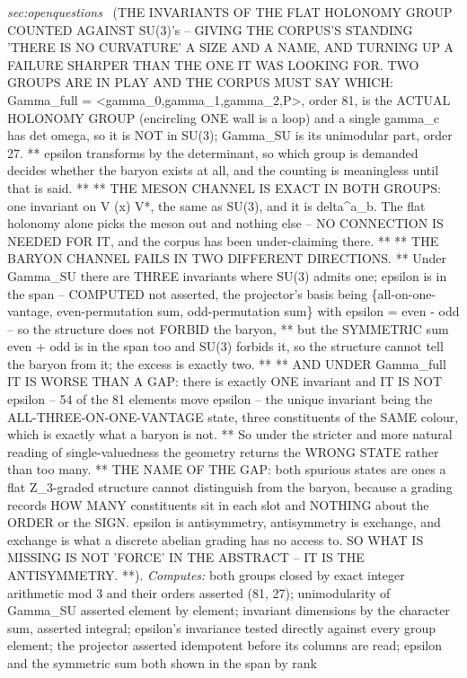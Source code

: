 \begin{description}
\textit{sec:openquestions} \ (THE INVARIANTS OF THE FLAT HOLONOMY GROUP COUNTED AGAINST SU(3)'s -- GIVING THE CORPUS'S STANDING 'THERE IS NO CURVATURE' A SIZE AND A NAME, AND TURNING UP A FAILURE SHARPER THAN THE ONE IT WAS LOOKING FOR. TWO GROUPS ARE IN PLAY AND THE CORPUS MUST SAY WHICH: Gamma\_full = <gamma\_0,gamma\_1,gamma\_2,P>, order 81, is the ACTUAL HOLONOMY GROUP (encircling ONE wall is a loop) and a single gamma\_c has det omega, so it is NOT in SU(3); Gamma\_SU is its unimodular part, order 27. ** epsilon transforms by the determinant, so which group is demanded decides whether the baryon exists at all, and the counting is meaningless until that is said. ** ** THE MESON CHANNEL IS EXACT IN BOTH GROUPS: one invariant on V (x) V*, the same as SU(3), and it is delta\textasciicircum{}a\_b. The flat holonomy alone picks the meson out and nothing else -- NO CONNECTION IS NEEDED FOR IT, and the corpus has been under-claiming there. ** ** THE BARYON CHANNEL FAILS IN TWO DIFFERENT DIRECTIONS. ** Under Gamma\_SU there are THREE invariants where SU(3) admits one; epsilon is in the span -- COMPUTED not asserted, the projector's basis being \{all-on-one-vantage, even-permutation sum, odd-permutation sum\} with epsilon = even - odd -- so the structure does not FORBID the baryon, ** but the SYMMETRIC sum even + odd is in the span too and SU(3) forbids it, so the structure cannot tell the baryon from it; the excess is exactly two. ** ** AND UNDER Gamma\_full IT IS WORSE THAN A GAP: there is exactly ONE invariant and IT IS NOT epsilon -- 54 of the 81 elements move epsilon -- the unique invariant being the ALL-THREE-ON-ONE-VANTAGE state, three constituents of the SAME colour, which is exactly what a baryon is not. ** So under the stricter and more natural reading of single-valuedness the geometry returns the WRONG STATE rather than too many. ** THE NAME OF THE GAP: both spurious states are ones a flat Z\_3-graded structure cannot distinguish from the baryon, because a grading records HOW MANY constituents sit in each slot and NOTHING about the ORDER or the SIGN. epsilon is antisymmetry, antisymmetry is exchange, and exchange is what a discrete abelian grading has no access to. SO WHAT IS MISSING IS NOT 'FORCE' IN THE ABSTRACT -- IT IS THE ANTISYMMETRY. **). 
\emph{Computes:} both groups closed by exact integer arithmetic mod 3 and their orders asserted (81, 27); unimodularity of Gamma\_SU asserted element by element; invariant dimensions by the character sum, asserted integral; epsilon's invariance tested directly against every group element; the projector asserted idempotent before its columns are read; epsilon and the symmetric sum both shown in the span by rank

\end{description}
